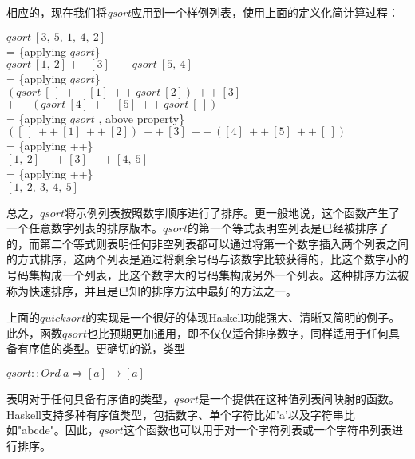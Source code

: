 相应的，现在我们将\textit{qsort}应用到一个样例列表，使用上面的定义化简计算过程：

\noindent\hspace*{1cm} $qsort~[3,~5,~1,~4,~2]$\\
\hspace*{1cm} = \{applying $qsort$\}\\
\hspace*{1cm} $qsort~[1,~2] ++ [3] ++ qsort~[5,~4]$\\
\hspace*{1cm} = \{applying $qsort$\}\\
\hspace*{1cm} $(qsort~[~]~++~[1]~++~qsort~[2])~++~[3]$\\
\hspace*{1cm} $++~(qsort~[4]~++~[5]~++~qsort~[~])$\\
\hspace*{1cm} = \{applying $qsort$ , above property\}\\
\hspace*{1cm} $([~]~++~[1]~++~[2])~++~[3]~++~([4]~++~[5]~++~[~])$\\
\hspace*{1cm} = \{applying ++\}\\
\hspace*{1cm} $[1,~2]~++~[3]~++~[4,~5]$\\
\hspace*{1cm} = \{applying ++\}\\
\hspace*{1cm} $[1,~2,~3,~4,~5]$

总之，$qsort$将示例列表按照数字顺序进行了排序。更一般地说，这个函数产生了一个任意数字列表的排序版本。$qsort$的第一个等式表明空列表是已经被排序了的，而第二个等式则表明任何非空列表都可以通过将第一个数字插入两个列表之间的方式排序，这两个列表是通过将剩余号码与该数字比较获得的，比这个数字小的号码集构成一个列表，比这个数字大的号码集构成另外一个列表。这种排序方法被称为快速排序，并且是已知的排序方法中最好的方法之一。

上面的$quicksort$的实现是一个很好的体现Haskell功能强大、清晰又简明的例子。此外，函数$qsort$也比预期更加通用，即不仅仅适合排序数字，同样适用于任何具备有序值的类型。更确切的说，类型

\noindent\hspace*{1cm} $qsort::Ord~a \Rightarrow [a ] \rightarrow [a ]$

表明对于任何具备有序值的类型，$qsort$是一个提供在这种值列表间映射的函数。Haskell支持多种有序值类型，包括数字、单个字符比如'a'以及字符串比如"abcde"。因此，$qsort$这个函数也可以用于对一个字符列表或一个字符串列表进行排序。

